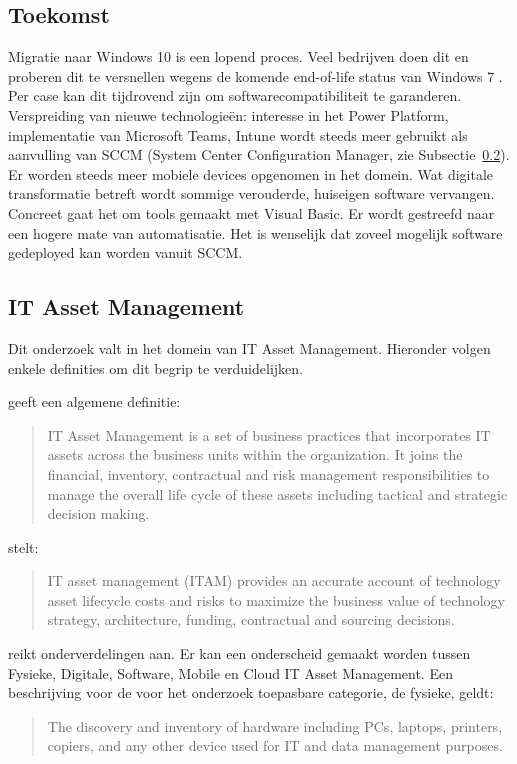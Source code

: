 \subsection{Toekomst}

Migratie naar Windows 10 is een lopend proces. Veel bedrijven doen dit en proberen dit te versnellen wegens de komende end-of-life status van Windows 7 \autocite{MicrosoftSupport2020}. Per case kan dit tijdrovend zijn om softwarecompatibiliteit te garanderen.
Verspreiding van nieuwe technologieën: interesse in het Power Platform, implementatie van Microsoft Teams, Intune wordt steeds meer gebruikt als aanvulling van SCCM (System Center Configuration Manager, zie Subsectie~\ref{subsec:itam}). Er worden steeds meer mobiele devices opgenomen in het domein.
Wat digitale transformatie betreft wordt sommige verouderde, huiseigen software vervangen. Concreet gaat het om tools gemaakt met Visual Basic.
Er wordt gestreefd naar een hogere mate van automatisatie. Het is wenselijk dat zoveel mogelijk software gedeployed kan worden vanuit SCCM.

\subsection{IT Asset Management}
\label{subsec:itam}

Dit onderzoek valt in het domein van IT Asset Management. Hieronder volgen enkele definities om dit begrip te verduidelijken.

\textcite{IAITAM} geeft een algemene definitie: 
\begin{quote}
    IT Asset Management is a set of business practices that incorporates IT assets across the business units within the organization. It joins the financial, inventory, contractual and risk management responsibilities to manage the overall life cycle of these assets including tactical and strategic decision making.
\end{quote}

\textcite{Gartner} stelt:
\begin{quote}
    IT asset management (ITAM) provides an accurate account of technology asset lifecycle costs and risks to maximize the business value of technology strategy, architecture, funding, contractual and sourcing decisions.
\end{quote}

\textcite{Ivanti2018} reikt onderverdelingen aan. Er kan een onderscheid gemaakt worden tussen Fysieke, Digitale, Software, Mobile en Cloud IT Asset Management.
Een beschrijving voor de voor het onderzoek toepasbare categorie, de fysieke, geldt:
\begin{quote}
    The discovery and inventory of hardware including PCs, laptops, printers, copiers, and any other device used for IT and data management purposes.
\end{quote}

